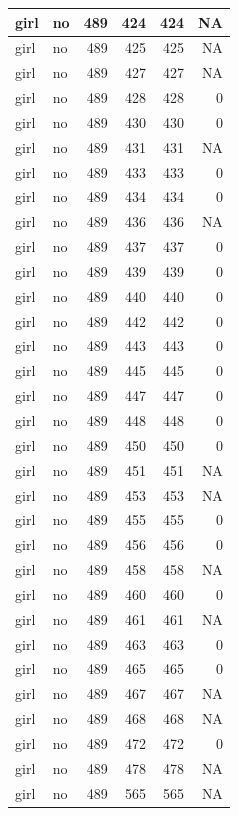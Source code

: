\documentclass[man]{apa6}
\begin{document}
\begin{tabular}{l|l|r|r|r|r}
\hline
girl & no & 489 & 424 & 424 & NA\\
\hline
girl & no & 489 & 425 & 425 & NA\\
\hline
girl & no & 489 & 427 & 427 & NA\\
\hline
girl & no & 489 & 428 & 428 & 0\\
\hline
girl & no & 489 & 430 & 430 & 0\\
\hline
girl & no & 489 & 431 & 431 & NA\\
\hline
girl & no & 489 & 433 & 433 & 0\\
\hline
girl & no & 489 & 434 & 434 & 0\\
\hline
girl & no & 489 & 436 & 436 & NA\\
\hline
girl & no & 489 & 437 & 437 & 0\\
\hline
girl & no & 489 & 439 & 439 & 0\\
\hline
girl & no & 489 & 440 & 440 & 0\\
\hline
girl & no & 489 & 442 & 442 & 0\\
\hline
girl & no & 489 & 443 & 443 & 0\\
\hline
girl & no & 489 & 445 & 445 & 0\\
\hline
girl & no & 489 & 447 & 447 & 0\\
\hline
girl & no & 489 & 448 & 448 & 0\\
\hline
girl & no & 489 & 450 & 450 & 0\\
\hline
girl & no & 489 & 451 & 451 & NA\\
\hline
girl & no & 489 & 453 & 453 & NA\\
\hline
girl & no & 489 & 455 & 455 & 0\\
\hline
girl & no & 489 & 456 & 456 & 0\\
\hline
girl & no & 489 & 458 & 458 & NA\\
\hline
girl & no & 489 & 460 & 460 & 0\\
\hline
girl & no & 489 & 461 & 461 & NA\\
\hline
girl & no & 489 & 463 & 463 & 0\\
\hline
girl & no & 489 & 465 & 465 & 0\\
\hline
girl & no & 489 & 467 & 467 & NA\\
\hline
girl & no & 489 & 468 & 468 & NA\\
\hline
girl & no & 489 & 472 & 472 & 0\\
\hline
girl & no & 489 & 478 & 478 & NA\\
\hline
girl & no & 489 & 565 & 565 & NA\\

\end{tabular}
\end{document}
